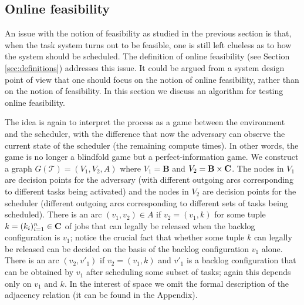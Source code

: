 \documentclass{llncs}
\newcommand{\tsys}{\ensuremath{\mathcal{T}}}
\newcommand{\backlog}{\ensuremath{\mathbf{B}}}
\begin{document}
\subsection{Online feasibility}
\label{sec:onlinefeas}
An issue with the notion of feasibility as studied in the previous section is  that, when the task system turns out to be feasible, one is still left clueless as to how the system should be scheduled. The definition of online feasibility (see Section \ref{sec:definitions}) addresses this issue. 
It could be argued from a system design point of view that one should focus on the notion of online feasibility, rather than on the notion of feasibility. 
In this section we discuss an algorithm for testing online feasibility. 





The idea is again to interpret the process as a game between the environment and the scheduler, with the difference that now the adversary can observe the current state of the scheduler (the remaining compute times). In other words, the game is no longer a blindfold game but a perfect-information game. We construct a graph $G(\tsys)=(V_1,V_2,A)$ where $V_1=\backlog$ and $V_2=\backlog \times \rct$. The nodes in $V_1$ are decision points for the adversary (with different outgoing arcs corresponding to different tasks being activated) and the nodes in $V_2$ are decision points for the scheduler (different outgoing arcs corresponding to different sets of tasks being scheduled). There is an arc $(v_1,v_2) \in A$ if $v_2=(v_1,k)$ for some tuple $k=(k_i)_{i=1}^n \in \mathbf{C}$ of jobs that can legally be released when the backlog configuration is $v_1$; notice the crucial fact that whether some tuple $k$ can legally be released can be decided on the basis of the backlog configuration $v_1$ alone. There is an arc $(v_2,v'_1)$ if $v_2=(v_1,k)$ and $v'_1$ is a backlog configuration that can be obtained by $v_1$ after scheduling some subset of tasks; again this depends only on $v_1$ and $k$. In the interest of space we omit the formal description of the adjacency relation (it can be found in the Appendix). 
\end{document}

